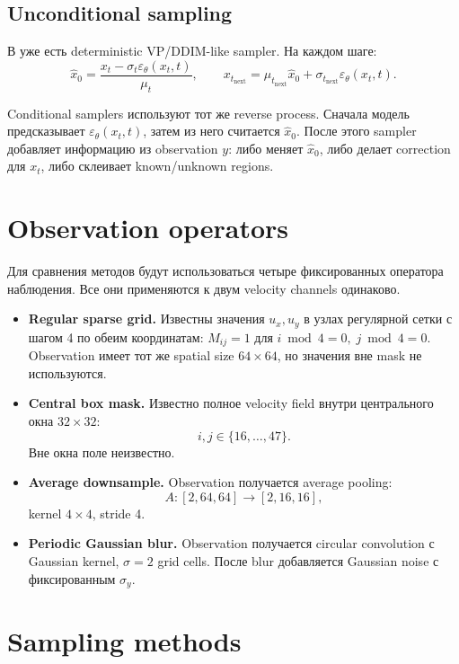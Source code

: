 \documentclass[10pt]{article}
\newcommand{\code}[1]{\texttt{\detokenize{#1}}}
\begin{document}
\subsection{Unconditional sampling}

В \code{score_training/sde.py} уже есть deterministic VP/DDIM-like sampler. На каждом шаге:
\[
    \hat x_0 =
    \frac{x_t-\sigma_t\varepsilon_\theta(x_t,t)}{\mu_t},
    \qquad
    x_{t_{\mathrm{next}}} =
    \mu_{t_{\mathrm{next}}}\hat x_0
    + \sigma_{t_{\mathrm{next}}}\varepsilon_\theta(x_t,t).
\]

Conditional samplers используют тот же reverse process. Сначала модель предсказывает
\(\varepsilon_\theta(x_t,t)\), затем из него считается \(\hat x_0\). После этого sampler
добавляет информацию из observation \(y\): либо меняет \(\hat x_0\), либо делает correction
для \(x_t\), либо склеивает known/unknown regions.

\section{Observation operators}

Для сравнения методов будут использоваться четыре фиксированных оператора наблюдения.
Все они применяются к двум velocity channels одинаково.

\begin{itemize}
  \item \textbf{Regular sparse grid.} Известны значения \(u_x,u_y\) в узлах регулярной
        сетки с шагом 4 по обеим координатам:
        \(M_{ij}=1\) для \(i\bmod 4=0,\; j\bmod 4=0\).
        Observation имеет тот же spatial size \(64{\times}64\), но значения вне mask
        не используются.
  \item \textbf{Central box mask.} Известно полное velocity field внутри центрального окна
        \(32{\times}32\):
        \[
            i,j \in \{16,\ldots,47\}.
        \]
        Вне окна поле неизвестно.
  \item \textbf{Average downsample.} Observation получается average pooling:
        \[
            A: [2,64,64]\rightarrow [2,16,16],
        \]
        kernel \(4{\times}4\), stride 4.
  \item \textbf{Periodic Gaussian blur.} Observation получается circular convolution
        с Gaussian kernel, \(\sigma=2\) grid cells. После blur добавляется Gaussian noise
        с фиксированным \(\sigma_y\).
\end{itemize}

\section{Sampling methods}
\end{document}
